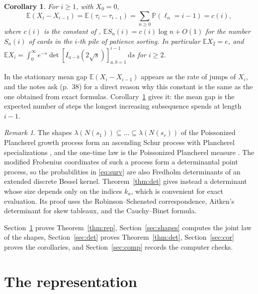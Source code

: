 \documentclass[11pt]{amsart}
\newtheorem{corollary}[theorem]{Corollary}
\theoremstyle{remark}
\newtheorem{remark}[theorem]{Remark}
\numberwithin{equation}{section}
\newcommand{\E}{\mathbb E}
\newcommand{\Pp}{\mathbb P}
\newcommand{\dd}{\,\mathrm d}
\begin{document}
\begin{corollary}\label{cor:c}
For $i\ge1$, with $X_0=0$,
\[
\E(X_i-X_{i-1})=\E(\tau_i-\tau_{i-1})=\sum_{n\ge0}\Pp(\ell_n=i-1)=c(i),
\]
where $c(i)$ is the constant of \cite[Proposition~9]{AD99}, $\E S_n(i)=c(i)\log n+O(1)$ for the number $S_n(i)$ of cards in the $i$-th pile of patience sorting. In particular $\E X_2=e$, and $\E X_i=\int_0^\infty e^{-s}\det[I_{a-b}(2\sqrt s)]_{a,b=1}^{i-1}\dd s$ for $i\ge2$.
\end{corollary}

In \cite[(44)]{AD93} the stationary mean gap $\E(X_i-X_{i-1})$ appears as the rate of jumps of $X_i$, and the notes ask (p.~38) for a direct reason why this constant is the same as the one obtained from exact formulas. Corollary~\ref{cor:c} gives it: the mean gap is the expected number of steps the longest increasing subsequence spends at length $i-1$.

\begin{remark}\label{rem:schur}
The shapes $\lambda(N(s_1))\subseteq\dots\subseteq\lambda(N(s_r))$ of the Poissonized Plancherel growth process form an ascending Schur process with Plancherel specializations \cite{OR03}, and the one-time law is the Poissonized Plancherel measure \cite{BOO00}. The modified Frobenius coordinates of such a process form a determinantal point process, so the probabilities in \eqref{eq:surv} are also Fredholm determinants of an extended discrete Bessel kernel. Theorem~\ref{thm:det} gives instead a determinant whose size depends only on the indices $k_a$, which is convenient for exact evaluation. Its proof uses the Robinson--Schensted correspondence, Aitken's determinant for skew tableaux, and the Cauchy--Binet formula.
\end{remark}

Section~\ref{sec:rep} proves Theorem~\ref{thm:rep}, Section~\ref{sec:shapes} computes the joint law of the shapes, Section~\ref{sec:det} proves Theorem~\ref{thm:det}, Section~\ref{sec:cor} proves the corollaries, and Section~\ref{sec:comp} records the computer checks.

\section{The representation}\label{sec:rep}
\end{document}
